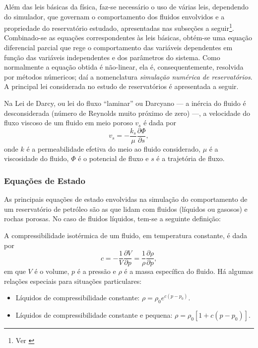 Al\'{e}m das leis b\'{a}sicas da f\'{i}sica, faz-se necess\'{a}rio o uso de v\'{a}rias leis, dependendo do simulador, que governam o comportamento dos fluidos envolvidos e a propriedade do reservat\'{o}rio estudado, apresentadas nas subse\c{c}\~{o}es a seguir\footnote{Ver \cite[pp. 520-522]{engres}}. Combinado-se as equa\c{c}\~{o}es correspondentes \`{a}s leis b\'{a}sicas, obt\'{e}m-se uma equa\c{c}\~{a}o diferencial parcial que rege o comportamento das vari\'{a}veis dependentes em fun\c{c}\~{a}o das vari\'{a}veis independentes e dos par\^{a}metros do sistema. Como normalmente a equa\c{c}\~{a}o obtida \'{e} n\~{a}o-linear, ela \'{e}, consequentemente, resolvida por m\'{e}todos n\'{u}mericos; da\'{i} a nomenclatura \textit{simula\c{c}\~{a}o num\'{e}rica de reservat\'{o}rios}. A principal lei considerada no estudo de reservat\'{o}rios \'{e} apresentada a seguir. 

\begin{law}
Na Lei de Darcy, ou lei do fluxo ``laminar'' ou Darcyano --- a in\'{e}rcia do fluido \'{e} desconsiderada (n\'{u}mero de Reynolds muito pr\'{o}ximo de zero) ---, a velocidade do fluxo viscoso de um fluido em meio poroso $v_s$ \'{e} dada por
\begin{equation}
	v_s = -\frac{k_s}{\mu} \frac{\partial\Phi}{\partial s},
\end{equation}
onde $k$ \'{e} a permeabilidade efetiva do meio ao fluido considerado, $\mu$ \'{e} a viscosidade do fluido, $\Phi$ \'{e} o potencial de fluxo e $s$ \'{e} a trajet\'{o}ria de fluxo.
\end{law}

\subsubsection{Equa\c{c}\~{o}es de Estado}
As principais equa\c{c}\~{o}es de estado envolvidas na simula\c{c}\~{a}o do comportamento de um reservat\'{o}rio de petr\'{o}leo s\~{a}o as que lidam com fluidos (l\'{i}quidos ou gasosos) e rochas porosas. No caso de fluidos l\'{i}quidos, tem-se a seguinte defini\c{c}\~{a}o:

\begin{definition}
A compressibilidade isot\'{e}rmica de um fluido, em temperatura constante, \'{e} dada por
\begin{equation}
	c = -\frac{1}{V}\frac{\partial V}{\partial p} = \frac{1}{\rho}\frac{\partial \rho}{\partial p},
\end{equation}
em que $V$ \'{e} o volume, $p$ \'{e} a press\~{a}o e $\rho$ \'{e} a massa espec\'{i}fica do fluido. H\'{a} algumas rela\c{c}\~{o}es especiais para situa\c{c}\~{o}es particulares:
\begin{itemize}
\item L\'{i}quidos de compressibilidade constante: $\rho = \rho_0 e^{c(p-p_0)}$.
\item L\'{i}quidos de compressibilidade constante e pequena: $\rho = \rho_0 \left[1+c\left(p-p_0\right)\right]$.
\end{itemize}
\end{definition}

